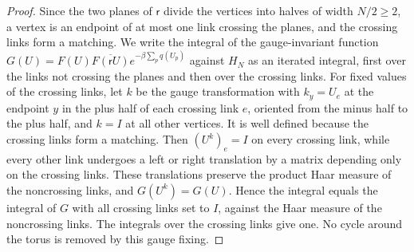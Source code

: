 \begin{proof}
Since the two planes of $\mathsf r$ divide the vertices into halves of width $N/2\ge2$, a vertex is an endpoint of at most one link crossing the planes, and the crossing links form a matching. We write the integral of the gauge-invariant function $G(U)=F(U)\overline{F(\mathsf rU)}e^{-\beta\sum_pq(U_p)}$ against $H_N$ as an iterated integral, first over the links not crossing the planes and then over the crossing links. For fixed values of the crossing links, let $k$ be the gauge transformation with $k_y=U_e$ at the endpoint $y$ in the plus half of each crossing link $e$, oriented from the minus half to the plus half, and $k=I$ at all other vertices. It is well defined because the crossing links form a matching. Then $(U^k)_e=I$ on every crossing link, while every other link undergoes a left or right translation by a matrix depending only on the crossing links. These translations preserve the product Haar measure of the noncrossing links, and $G(U^k)=G(U)$. Hence the integral equals the integral of $G$ with all crossing links set to $I$, against the Haar measure of the noncrossing links. The integrals over the crossing links give one. No cycle around the torus is removed by this gauge fixing.


\end{proof}
